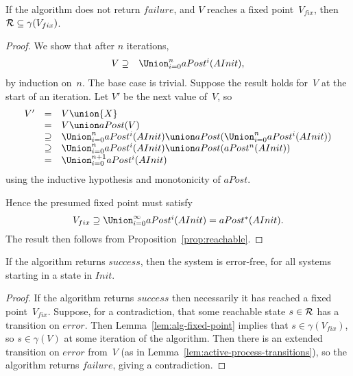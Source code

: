 \begin{lemma}
\label{lem:alg-fixed-point}
If the algorithm does not return $failure$, and $V$ reaches a fixed
point~$V_{fix}$, then
$\mathcal{R} \subseteq \gamma( {V_{fix}} )$.
\end{lemma}
%
\begin{proof}
We show that after $n$ iterations,
\begin{eqnarray*}
{V} & \supseteq & \textstyle\Union_{i = 0}^n aPost^i({AInit}),
\end{eqnarray*}
%
by induction on~$n$.  The base case is trivial.  Suppose the result holds
for~$V$ at the start of an iteration.  Let $V'$ be the next value of~$V$, so
\[
\begin{array}{rcl}
{V'} & = & {V} \union {X} \\ 
& = & {V} \union aPost({V}) \\
& \supseteq & \Union_{i = 0}^n aPost^i({AInit}) \union
      aPost(\Union_{i = 0}^n aPost^i({AInit})) \\
& \supseteq & \Union_{i = 0}^n aPost^i({AInit}) \union 
  aPost(aPost^n({AInit})) \\
& = & \Union_{i = 0}^{n+1} aPost^i({AInit})
\end{array}
\] 
using the inductive hypothesis and monotonicity of $aPost$. 

Hence the presumed fixed point must satisfy
\[
{V_{fix}} \supseteq  \textstyle\Union_{i = 0}^\infty aPost^i({AInit}) = 
  aPost^*({AInit}).
\]
The result then follows from Proposition~\ref{prop:reachable}.
\end{proof}


\begin{prop}
If the algorithm returns $success$, then the system is error-free, for all
systems starting in a state in $Init$.
\end{prop}
%
\begin{proof}
If the algorithm returns $success$ then necessarily it has reached a
fixed point~$V_{fix}$.  Suppose, for a contradiction, that some reachable
state $s \in \mathcal{R}$ has a transition on $error$.  Then
Lemma~\ref{lem:alg-fixed-point} implies that $s \in \gamma({V_{fix}})$, so $s
\in \gamma({V})$ at some iteration of the algorithm.  Then there is an
extended transition on $error$ from~${V}$ (as in
Lemma~\ref{lem:active-process-transitions}), so the algorithm returns
$failure$, giving a contradiction. 
\end{proof}

